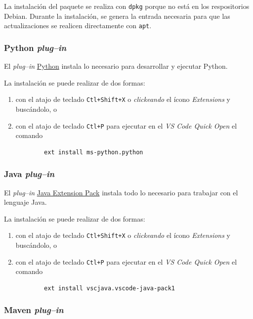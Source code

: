 La instalación del paquete se realiza con \verb|dpkg| porque no está en los respositorios Debian.  Durante la instalación, se genera la entrada necesaria para que las actualizaciones se realicen directamente con \verb|apt|.


\ifx\python\undefined
\subsubsection{Python \emph{plug--in}}
\label{pluginPython}

El \emph{plug--in} \href{https://marketplace.visualstudio.com/items?itemName=ms-python.python}{Python} instala lo necesario para desarrollar y ejecutar Python.

La instalación se puede realizar de dos formas:
\begin{enumerate}
	\item con el atajo de teclado \verb|Ctl+Shift+X| o \emph{clickeando} el ícono \emph{Extensions} y buscándolo, o
    \item con el atajo de teclado \verb|Ctl+P| para ejecutar en el \emph{VS Code Quick Open} el comando
    \begin{verbatim}
		ext install ms-python.python
	\end{verbatim}
\end{enumerate}
\fi

\subsubsection{Java \emph{plug--in}}
\label{pluginJava}

El \emph{plug--in} \href{https://marketplace.visualstudio.com/items?itemName=vscjava.vscode-java-pack}{Java Extension Pack} instala todo lo necesario para trabajar con el lenguaje Java.

La instalación se puede realizar de dos formas:
\begin{enumerate}
	\item con el atajo de teclado \verb|Ctl+Shift+X| o \emph{clickeando} el ícono \emph{Extensions} y buscándolo, o
    \item con el atajo de teclado \verb|Ctl+P| para ejecutar en el \emph{VS Code Quick Open} el comando
    \begin{verbatim}
		ext install vscjava.vscode-java-pack1
	\end{verbatim}
\end{enumerate}


\subsubsection{Maven \emph{plug--in}}
\label{pluginMaven}

